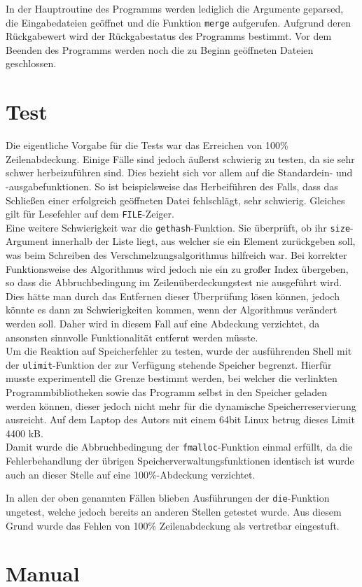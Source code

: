 \documentclass[a4paper,titlepage,12pt]{scrartcl}
\begin{document}
In der Hauptroutine des Programms werden lediglich die Argumente geparsed,
die Eingabedateien geöffnet und die Funktion \texttt{merge} aufgerufen.
Aufgrund deren Rückgabewert wird der Rückgabestatus des Programms bestimmt.
Vor dem Beenden des Programms werden noch die zu Beginn geöffneten Dateien geschlossen.

\section{Test}
\label{sec:test}
Die eigentliche Vorgabe für die Tests war das Erreichen von 100\% Zeilenabdeckung. 
Einige Fälle sind jedoch äußerst schwierig zu testen,
da sie sehr schwer herbeizuführen sind.
Dies bezieht sich vor allem auf die Standardein- und -ausgabefunktionen.
So ist beispielsweise das Herbeiführen des Falls,
dass das Schließen einer erfolgreich geöffneten Datei fehlschlägt,
sehr schwierig.
Gleiches gilt für Lesefehler auf dem \texttt{FILE}-Zeiger.
\\
Eine weitere Schwierigkeit war die \texttt{gethash}-Funktion.
Sie überprüft,
ob ihr \texttt{size}-Argument innerhalb der Liste liegt,
aus welcher sie ein Element zurückgeben soll,
was beim Schreiben des Verschmelzungsalgorithmus hilfreich war.
Bei korrekter Funktionsweise des Algorithmus wird jedoch nie ein zu großer Index übergeben,
so dass die Abbruchbedingung im Zeilenüberdeckungstest nie ausgeführt wird.
Dies hätte man durch das Entfernen dieser Überprüfung lösen können,
jedoch könnte es dann zu Schwierigkeiten kommen,
wenn der Algorithmus verändert werden soll.
Daher wird in diesem Fall auf eine Abdeckung verzichtet,
da ansonsten sinnvolle Funktionalität entfernt werden müsste.
\\
Um die Reaktion auf Speicherfehler zu testen,
wurde der ausführenden Shell mit der \texttt{ulimit}-Funktion der zur Verfügung stehende Speicher begrenzt.
Hierfür musste experimentell die Grenze bestimmt werden,
bei welcher die verlinkten Programmbibliotheken sowie das Programm selbst in den Speicher geladen werden können,
dieser jedoch nicht mehr für die dynamische Speicherreservierung ausreicht.
Auf dem Laptop des Autors mit einem 64bit Linux betrug dieses Limit 4400 kB.
\\
Damit wurde die Abbruchbedingung der \texttt{fmalloc}-Funktion einmal erfüllt,
da die Fehlerbehandlung der übrigen Speicherverwaltungsfunktionen identisch ist wurde auch an dieser Stelle auf eine 100\%-Abdeckung verzichtet.

In allen der oben genannten Fällen blieben Ausführungen der \texttt{die}-Funktion ungetest,
welche jedoch bereits an anderen Stellen getestet wurde.
Aus diesem Grund wurde das Fehlen von 100\% Zeilenabdeckung als vertretbar eingestuft.

\clearpage
\appendix

\section{Manual}
\label{apx:man}




\end{document}
